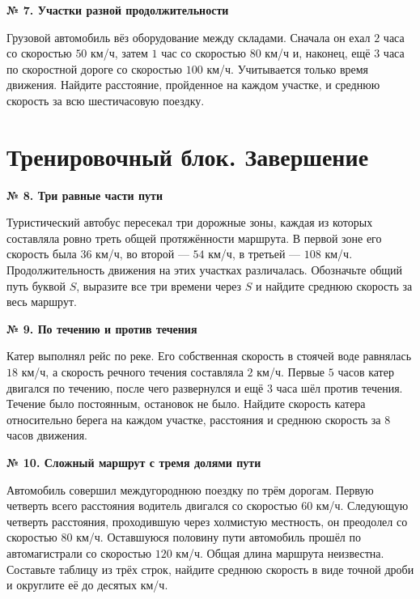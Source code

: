 \documentclass[a4paper,12pt]{article}
\newcommand{\task}[2]{\par\smallskip\noindent\textbf{№ #1. #2}\par\nobreak\smallskip}
\begin{document}
\task{7}{Участки разной продолжительности}
Грузовой автомобиль вёз оборудование между складами. Сначала он ехал $2$ часа со скоростью $50$ км/ч, затем $1$ час со скоростью $80$ км/ч и, наконец, ещё $3$ часа по скоростной дороге со скоростью $100$ км/ч. Учитывается только время движения. Найдите расстояние, пройденное на каждом участке, и среднюю скорость за всю шестичасовую поездку.

\clearpage
\section*{Тренировочный блок. Завершение}
\task{8}{Три равные части пути}
Туристический автобус пересекал три дорожные зоны, каждая из которых составляла ровно треть общей протяжённости маршрута. В первой зоне его скорость была $36$ км/ч, во второй --- $54$ км/ч, в третьей --- $108$ км/ч. Продолжительность движения на этих участках различалась. Обозначьте общий путь буквой $S$, выразите все три времени через $S$ и найдите среднюю скорость за весь маршрут.

\task{9}{По течению и против течения}
Катер выполнял рейс по реке. Его собственная скорость в стоячей воде равнялась $18$ км/ч, а скорость речного течения составляла $2$ км/ч. Первые $5$ часов катер двигался по течению, после чего развернулся и ещё $3$ часа шёл против течения. Течение было постоянным, остановок не было. Найдите скорость катера относительно берега на каждом участке, расстояния и среднюю скорость за $8$ часов движения.

\task{10}{Сложный маршрут с тремя долями пути}
Автомобиль совершил междугороднюю поездку по трём дорогам. Первую четверть всего расстояния водитель двигался со скоростью $60$ км/ч. Следующую четверть расстояния, проходившую через холмистую местность, он преодолел со скоростью $80$ км/ч. Оставшуюся половину пути автомобиль прошёл по автомагистрали со скоростью $120$ км/ч. Общая длина маршрута неизвестна. Составьте таблицу из трёх строк, найдите среднюю скорость в виде точной дроби и округлите её до десятых км/ч.
\endgroup

\clearpage
\end{document}
